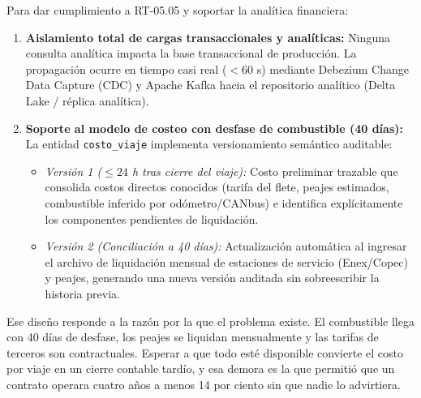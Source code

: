 Para dar cumplimiento a RT-05.05 y soportar la analítica financiera:

\begin{enumerate}
    \item \textbf{Aislamiento total de cargas transaccionales y analíticas:} Ninguna consulta analítica impacta la base transaccional de producción. La propagación ocurre en tiempo casi real ($< 60$ s) mediante Debezium Change Data Capture (CDC) y Apache Kafka hacia el repositorio analítico (Delta Lake / réplica analítica).
    \item \textbf{Soporte al modelo de costeo con desfase de combustible (40 días):} La entidad \texttt{costo\_viaje} implementa versionamiento semántico auditable:
    \begin{itemize}
        \item \textit{Versión 1 ($\le 24$ h tras cierre del viaje):} Costo preliminar trazable que consolida costos directos conocidos (tarifa del flete, peajes estimados, combustible inferido por odómetro/CANbus) e identifica explícitamente los componentes pendientes de liquidación.
        \item \textit{Versión 2 (Conciliación a 40 días):} Actualización automática al ingresar el archivo de liquidación mensual de estaciones de servicio (Enex/Copec) y peajes, generando una nueva versión auditada sin sobreescribir la historia previa.
    \end{itemize}
\end{enumerate}


Ese diseño responde a la razón por la que el problema existe. El combustible llega con 40 días de desfase, los peajes se liquidan mensualmente y las tarifas de terceros son contractuales. Esperar a que todo esté disponible convierte el costo por viaje en un cierre contable tardío, y esa demora es la que permitió que un contrato operara cuatro años a menos 14 por ciento sin que nadie lo advirtiera.
